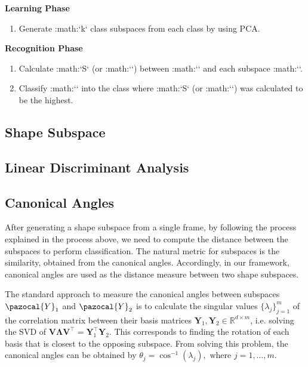 \textbf{Learning Phase}

\begin{enumerate}
    \item Generate :math:`k` class subspaces from each class by using PCA.
\end{enumerate}

\textbf{Recognition Phase}

\begin{enumerate}
    \item Calculate :math:`S` (or :math:``) between :math:`` and each subspace :math:``. 
    \item Classify :math:`` into the class where :math:`S` (or :math:``) was calculated to be the highest.
\end{enumerate}

\subsection{Shape Subspace}

\subsection{Linear Discriminant Analysis}

\subsection{Canonical Angles}

After generating a shape subspace from a single frame, by following the process explained in the process above, we need to compute the distance between the subspaces to perform classification. The natural metric for subspaces is the similarity, obtained from the canonical angles. Accordingly, in our framework, canonical angles are used as the distance measure between two shape subspaces.

The standard approach to measure the canonical angles between subspaces $\pazocal{Y}_1$ and $\pazocal{Y}_2$ is to calculate the singular values $\{\lambda_j\}_{j=1}^{m}$ of the correlation matrix between their basis matrices $\bm{Y}_1, \bm{Y}_2 \in \mathbb{R}^{d{\times}m}$, i.e. solving the SVD of $\bm{V}\bm{\Lambda}\bm{V}^{\top} = \bm{Y}_1^{\top}\bm{Y}_2$. This corresponds to finding the rotation of each basis that is closest to the opposing subspace. From solving this problem, the canonical angles can be obtained by $\theta_j = \cos^{-1}(\lambda_j), \text{ where } j = 1, \ldots, m$.


